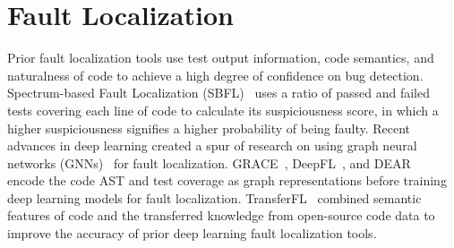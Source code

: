\documentclass[12pt,openany,oneside,table]{cmuthesis}
\begin{document}
\section{Fault Localization}
Prior fault localization tools use test output information, code semantics, and
naturalness of code to achieve a high degree of confidence on bug detection.
Spectrum-based Fault Localization (SBFL)~\cite{abreu2006evaluation,
abreu2007accuracy} uses a ratio of passed and failed tests covering each line of
code to calculate its suspiciousness score, in which a higher suspiciousness
signifies a higher probability of being faulty. Recent advances in deep learning
created a spur of research on using graph neural networks (GNNs)~\cite{GNN} for
fault localization. GRACE~\cite{Grace}, DeepFL~\cite{DeepFL}, and
DEAR~\cite{Dear} encode the code AST and test coverage as graph representations
before training deep learning models for fault localization.
TransferFL~\cite{TransferFL} combined semantic features of code and the
transferred knowledge from open-source code data to improve the accuracy of
prior deep learning fault localization tools.
\end{document}
